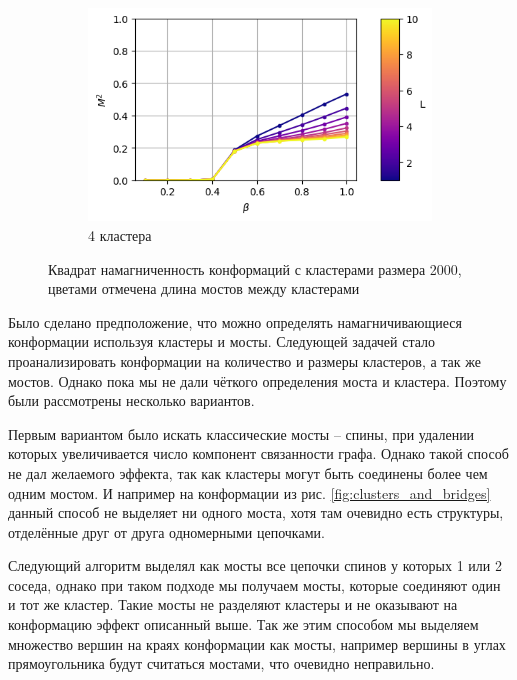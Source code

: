 \begin{figure}[ht]
\begin{subfigure}[t]{0.45\textwidth}
    \end{subfigure}
    \begin{subfigure}[t]{0.45\textwidth}
        \includegraphics*[width=\textwidth]{../images/magnetization_clusterized_W20_H50_N4.png}
        \caption*{4 кластера}
    \end{subfigure}
	\caption{Квадрат намагниченность конформаций с кластерами размера 2000, цветами отмечена длина мостов между кластерами}
	\label{fig:cluster_magnetization}
\end{figure}


Было сделано предположение, что можно определять намагничивающиеся конформации используя кластеры и мосты. Следующей задачей стало проанализировать конформации на количество и размеры кластеров, а так же мостов. Однако пока мы не дали чёткого определения моста и кластера. Поэтому были рассмотрены несколько вариантов.

Первым вариантом было искать классические мосты -- спины, при удалении которых увеличивается число компонент связанности графа. Однако такой способ не дал желаемого эффекта, так как кластеры могут быть соединены более чем одним мостом. И например на конформации из рис. \ref{fig:clusters_and_bridges} данный способ не выделяет ни одного моста, хотя там очевидно есть структуры, отделённые друг от друга одномерными цепочками. 

Следующий алгоритм выделял как мосты все цепочки спинов у которых 1 или 2 соседа, однако при таком подходе мы получаем мосты, которые соединяют один и тот же кластер. Такие мосты не разделяют кластеры и не оказывают на конформацию эффект описанный выше. Так же этим способом мы выделяем множество вершин на краях конформации как мосты, например вершины в углах прямоугольника будут считаться мостами, что очевидно неправильно.

